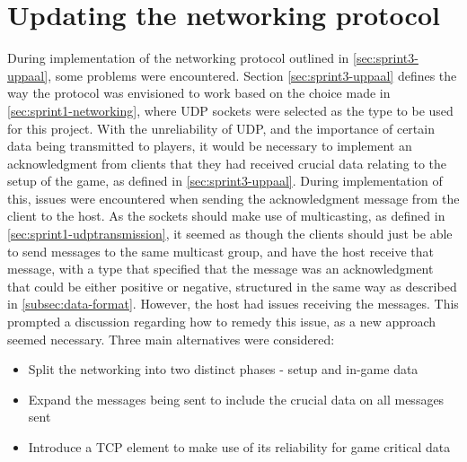 \section{Updating the networking protocol}
During implementation of the networking protocol outlined in \autoref{sec:sprint3-uppaal}, some problems were encountered.
Section \ref{sec:sprint3-uppaal} defines the way the protocol was envisioned to work based on the choice made in \autoref{sec:sprint1-networking}, where UDP sockets were selected as the type to be used for this project.
With the unreliability of UDP, and the importance of certain data being transmitted to players, it would be necessary to implement an acknowledgment from clients that they had received crucial data relating to the setup of the game, as defined in \autoref{sec:sprint3-uppaal}.
During implementation of this, issues were encountered when sending the acknowledgment message from the client to the host.
As the sockets should make use of multicasting, as defined in \autoref{sec:sprint1-udptransmission}, it seemed as though the clients should just be able to send messages to the same multicast group, and have the host receive that message, with a type that specified that the message was an acknowledgment that could be either positive or negative, structured in the same way as described in \autoref{subsec:data-format}.
However, the host had issues receiving the messages.
This prompted a discussion regarding how to remedy this issue, as a new approach seemed necessary.
Three main alternatives were considered:
\begin{itemize}
    \item Split the networking into two distinct phases - setup and in-game data
    \item Expand the messages being sent to include the crucial data on all messages sent
    \item Introduce a TCP element to make use of its reliability for game critical data
\end{itemize}

